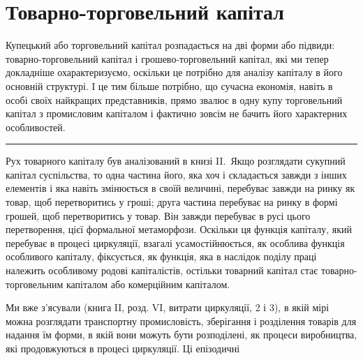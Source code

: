 


\section{Товарно-торговельний капітал}

Купецький або торговельний капітал розпадається на дві
форми або підвиди: товарно-торговельний капітал і грошево-торговельний
капітал, які ми тепер докладніше охарактеризуємо,
оскільки це потрібно для аналізу капіталу в його основній структурі.
І це тим більше потрібно, що сучасна економія, навіть
в особі своїх найкращих представників, прямо звалює в одну
купу торговельний капітал з промисловим капіталом і фактично
зовсім не бачить його характерних особливостей.

\pfbreak{}

Рух товарного капіталу був аналізований в книзі II.~Якщо
розглядати сукупний капітал суспільства, то одна частина
його, яка хоч і складається завжди з інших елементів і яка навіть
змінюється в своїй величині, перебуває завжди на ринку
як товар, щоб перетворитись у гроші; друга частина перебуває
на ринку в формі грошей, щоб перетворитись у товар. Він
завжди перебуває в русі цього перетворення, цієї формальної
метаморфози. Оскільки ця функція капіталу, який перебуває
в процесі циркуляції, взагалі усамостійнюється, як особлива
функція особливого капіталу, фіксується, як функція, яка в наслідок
поділу праці належить особливому родові капіталістів,
остільки товарний капітал стає товарно-торговельним капіталом
або комерційним капіталом.

Ми вже з’ясували (книга II, розд. VI, витрати циркуляції,
2 і 3), в якій мірі можна розглядати транспортну промисловість,
зберігання і розділення товарів для надання їм форми,
в якій вони можуть бути розподілені, як процеси виробництва,
які продовжуються в процесі циркуляції. Ці епізодичні
\parbreak{}  %
